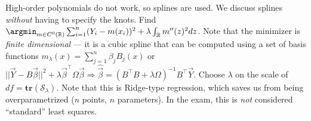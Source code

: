 \begin{sectionbox}\nospacing{}
  High-order polynomials do not work, so splines are used. We discuss splines \emph{without} having to specify the knots.
  Find $\argmin_{m \in C^{0}(\mathbb{R})} \sum_{i=1}^{n}(Y_{i} - m(x_{i}))^{2} + \lambda \int_{\mathbb{R}}m''(z)^{2} dz$.
  Note that the minimizer is \emph{finite dimensional} --- it is a cubic spline that can be computed using a set of basis functions $m_{\lambda}(x) = \sum_{j=1}^{n}\beta_{j}B_{j}(x)$ or $||\vec{Y} - B\vec{\beta}||^{2}+\lambda \vec{\beta}^{\top}\Omega\vec{\beta} \Rightarrow \hat{\vec{\beta}} = {(B^{\top}B + \lambda\Omega)}^{-1}B^{\top}\vec{Y}$.
  Choose $\lambda$ on the scale of $df = \mathbf{tr}(\mathcal{S}_{\lambda})$.
  Note that this is Ridge-type regression, which saves us from being overparametrized ($n$ points, $n$ parameters).
  In the exam, this is \emph{not} considered ``standard'' least squares.
\end{sectionbox}
